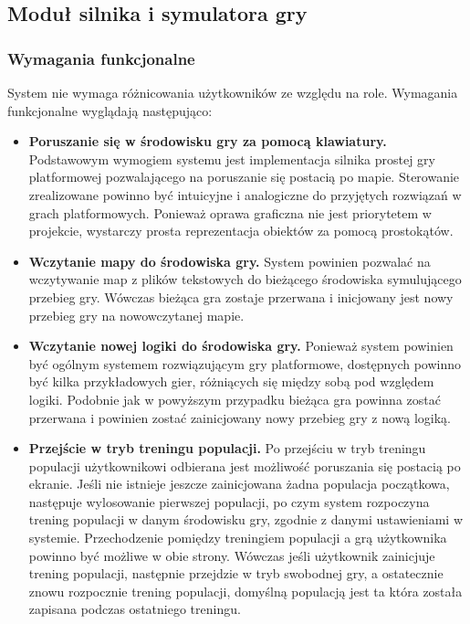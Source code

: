 \subsection{Moduł silnika i symulatora gry}

\subsubsection{Wymagania funkcjonalne}
	System nie wymaga różnicowania użytkowników ze względu na role. Wymagania funkcjonalne wyglądają następująco:
	\begin{itemize}
		\item {\bf Poruszanie się w środowisku gry za pomocą klawiatury.}
		\newline
		Podstawowym wymogiem systemu jest implementacja silnika prostej gry platformowej pozwalającego na poruszanie się postacią po mapie.
		Sterowanie zrealizowane powinno być intuicyjne i analogiczne do przyjętych rozwiązań w grach platformowych.
		Ponieważ oprawa graficzna nie jest priorytetem w projekcie, wystarczy prosta reprezentacja obiektów za pomocą prostokątów.
		\item {\bf Wczytanie mapy do środowiska gry.}
		\newline
		System powinien pozwalać na wczytywanie map z plików tekstowych do bieżącego środowiska symulującego przebieg gry.
		Wówczas bieżąca gra zostaje przerwana i inicjowany jest nowy przebieg gry na nowowczytanej mapie.
		\item {\bf Wczytanie nowej logiki do środowiska gry.}
		\newline
		Ponieważ system powinien być ogólnym systemem rozwiązującym gry platformowe, dostępnych powinno być kilka przykładowych gier,
		różniących się między sobą pod względem logiki. Podobnie jak w powyższym przypadku bieżąca gra powinna zostać przerwana i
		powinien zostać zainicjowany nowy przebieg gry z nową logiką.
		\item {\bf Przejście w tryb treningu populacji.}
		\newline
		Po przejściu w tryb treningu populacji użytkownikowi odbierana jest możliwość poruszania się postacią po ekranie.
		Jeśli nie istnieje jeszcze zainicjowana żadna populacja początkowa, następuje wylosowanie pierwszej populacji, po czym system rozpoczyna trening populacji w danym środowisku gry, zgodnie z danymi ustawieniami w systemie. Przechodzenie pomiędzy treningiem populacji a grą użytkownika powinno być możliwe w obie strony. 
		Wówczas jeśli użytkownik zainicjuje trening populacji, następnie przejdzie w tryb swobodnej gry, a ostatecznie znowu rozpocznie trening populacji, domyślną populacją jest ta która została zapisana podczas ostatniego treningu.

\end{itemize}
